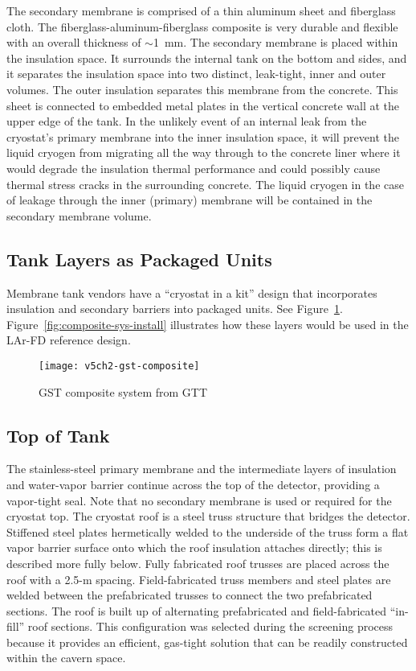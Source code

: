 The secondary membrane is comprised of a thin aluminum sheet and fiberglass cloth.  The fiberglass-aluminum-fiberglass composite is very durable and flexible with an overall thickness of $\sim$1~mm.  The secondary membrane is placed within the insulation space. It surrounds the internal tank on the bottom and sides, and it separates the insulation space into two distinct, leak-tight, inner and outer volumes. The outer insulation separates this membrane from the concrete.  
This sheet is connected to embedded metal plates in the vertical concrete wall at the upper edge of the tank. In the unlikely event of an internal leak from the cryostat's primary membrane into the inner insulation space, it will prevent the liquid cryogen from migrating all the way through to the concrete liner where it would degrade the insulation thermal performance and could possibly cause thermal stress cracks in the surrounding concrete. The liquid cryogen in the case of leakage through the inner (primary) membrane will be contained in the secondary membrane volume.  

\subsection{Tank Layers as Packaged Units}
Membrane tank vendors have a ``cryostat in a kit'' design that 
incorporates insulation and secondary barriers into packaged units. See Figure~\ref{fig:gst-composite}.  
Figure~\ref{fig:composite-sys-install} illustrates how these layers would be used in the LAr-FD reference design.

\begin{figure}[htbp]
\centering
\texttt{[image: v5ch2-gst-composite]}
\caption{GST composite system from GTT}
\label{fig:gst-composite}
\end{figure}

\subsection{Top of Tank}

The stainless-steel primary membrane and the intermediate layers of insulation and water-vapor barrier continue across the top of the detector, providing a vapor-tight seal.  Note that no secondary membrane is used or required for the cryostat top. 
The cryostat roof is a steel truss structure that bridges the detector.  Stiffened steel plates hermetically welded to the underside of the truss form a flat vapor barrier surface onto which the roof insulation attaches directly; this is described more fully below. Fully fabricated roof trusses are placed across the roof with a 2.5-m spacing.  Field-fabricated truss members and steel plates are welded between the prefabricated trusses to connect the two prefabricated sections.  The roof is built up of alternating prefabricated and field-fabricated ``in-fill'' roof sections.  This configuration was selected during the screening process because it provides an efficient, gas-tight solution that can be readily constructed within the cavern space.

